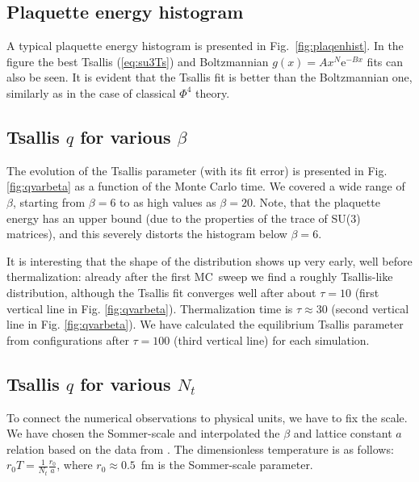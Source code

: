 \documentclass[aps,prd,twocolumn,showpacs,superscriptaddress,groupedaddress]{revtex4}  %
\begin{document}
\subsection{Plaquette energy histogram}
A typical plaquette energy histogram is presented in
Fig.~\ref{fig:plaqenhist}. In the figure the best {Tsallis
  (\ref{eq:su3Ts})} and Boltzmannian
\mbox{$g(x)=Ax^N \textrm{e}^{-B x}$} fits can also be seen. It is
evident that the Tsallis fit is better than the Boltzmannian one,
similarly as in the case of classical $\Phi^4$ theory.


\subsection{Tsallis $q$ for various $\beta$}

The evolution of the Tsallis parameter (with its fit error) is
presented in Fig. \ref{fig:qvarbeta} as a function of the Monte
Carlo time. We covered a wide range of $\beta$, starting from
$\beta=6$ to as high values as $\beta=20$. Note, that the plaquette
energy has an upper bound (due to the properties of the trace of SU(3)
matrices), and this severely distorts the histogram below
$\beta=6$. 

It is interesting that the shape of the distribution shows up very early,
well before thermalization: already after the first \mbox{MC sweep} we
find a roughly Tsallis-like distribution, although the Tsallis fit
converges well after about $\tau=10$ (first vertical line in
Fig. \ref{fig:qvarbeta}). Thermalization time is $\tau\approx30$
(second vertical line in Fig. \ref{fig:qvarbeta}). We have calculated
the equilibrium Tsallis parameter from configurations after $\tau=100$
(third vertical line) for each simulation.



\subsection{Tsallis $q$ for various $N_t$}
To connect the numerical observations to physical units, we have to
fix the scale. We have chosen the Sommer-scale \cite{Sommer:1993ce} and
interpolated the $\beta$ and lattice constant $a$ relation based on
the data from \cite{Francis:2015lha, Necco:2001xg, Guagnelli:1998ud}. The dimensionless temperature is as follows:
\mbox{$r_0T=\frac{1}{N_t}\frac{r_0}{a}$}, where \mbox{$r_0\approx0.5$
  fm} is the Sommer-scale parameter.
\end{document}
